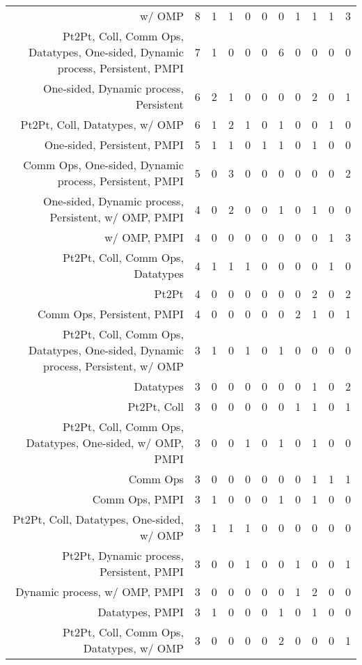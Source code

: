 {\begin{landscape}
\begin{longtable}[htb]{r|c|c|c|c|c|c|c|c|c|c}
{w/ OMP} & 8 & 1 & 1 & 0 & 0 & 0 & 1 & 1 & 1 & 3 \\%
{Pt2Pt, Coll, Comm Ops, Datatypes, One-sided, Dynamic process, Persistent, PMPI} & 7 & 1 & 0 & 0 & 0 & 6 & 0 & 0 & 0 & 0 \\%
{One-sided, Dynamic process, Persistent} & 6 & 2 & 1 & 0 & 0 & 0 & 0 & 2 & 0 & 1 \\%
{Pt2Pt, Coll, Datatypes, w/ OMP} & 6 & 1 & 2 & 1 & 0 & 1 & 0 & 0 & 1 & 0 \\%
{One-sided, Persistent, PMPI} & 5 & 1 & 1 & 0 & 1 & 1 & 0 & 1 & 0 & 0 \\%
{Comm Ops, One-sided, Dynamic process, Persistent, PMPI} & 5 & 0 & 3 & 0 & 0 & 0 & 0 & 0 & 0 & 2 \\%
{One-sided, Dynamic process, Persistent, w/ OMP, PMPI} & 4 & 0 & 2 & 0 & 0 & 1 & 0 & 1 & 0 & 0 \\%
{w/ OMP, PMPI} & 4 & 0 & 0 & 0 & 0 & 0 & 0 & 0 & 1 & 3 \\%
{Pt2Pt, Coll, Comm Ops, Datatypes} & 4 & 1 & 1 & 1 & 0 & 0 & 0 & 0 & 1 & 0 \\%
{Pt2Pt} & 4 & 0 & 0 & 0 & 0 & 0 & 0 & 2 & 0 & 2 \\%
{Comm Ops, Persistent, PMPI} & 4 & 0 & 0 & 0 & 0 & 0 & 2 & 1 & 0 & 1 \\%
{Pt2Pt, Coll, Comm Ops, Datatypes, One-sided, Dynamic process, Persistent, w/ OMP} & 3 & 1 & 0 & 1 & 0 & 1 & 0 & 0 & 0 & 0 \\%
{Datatypes} & 3 & 0 & 0 & 0 & 0 & 0 & 0 & 1 & 0 & 2 \\%
{Pt2Pt, Coll} & 3 & 0 & 0 & 0 & 0 & 0 & 1 & 1 & 0 & 1 \\%
{Pt2Pt, Coll, Comm Ops, Datatypes, One-sided, w/ OMP, PMPI} & 3 & 0 & 0 & 1 & 0 & 1 & 0 & 1 & 0 & 0 \\%
{Comm Ops} & 3 & 0 & 0 & 0 & 0 & 0 & 0 & 1 & 1 & 1 \\%
{Comm Ops, PMPI} & 3 & 1 & 0 & 0 & 0 & 1 & 0 & 1 & 0 & 0 \\%
{Pt2Pt, Coll, Datatypes, One-sided, w/ OMP} & 3 & 1 & 1 & 1 & 0 & 0 & 0 & 0 & 0 & 0 \\%
{Pt2Pt, Dynamic process, Persistent, PMPI} & 3 & 0 & 0 & 1 & 0 & 0 & 1 & 0 & 0 & 1 \\%
{Dynamic process, w/ OMP, PMPI} & 3 & 0 & 0 & 0 & 0 & 0 & 1 & 2 & 0 & 0 \\%
{Datatypes, PMPI} & 3 & 1 & 0 & 0 & 0 & 1 & 0 & 1 & 0 & 0 \\%
{Pt2Pt, Coll, Comm Ops, Datatypes, w/ OMP} & 3 & 0 & 0 & 0 & 0 & 2 & 0 & 0 & 0 & 1 \\%

\end{longtable}
\end{landscape}}
